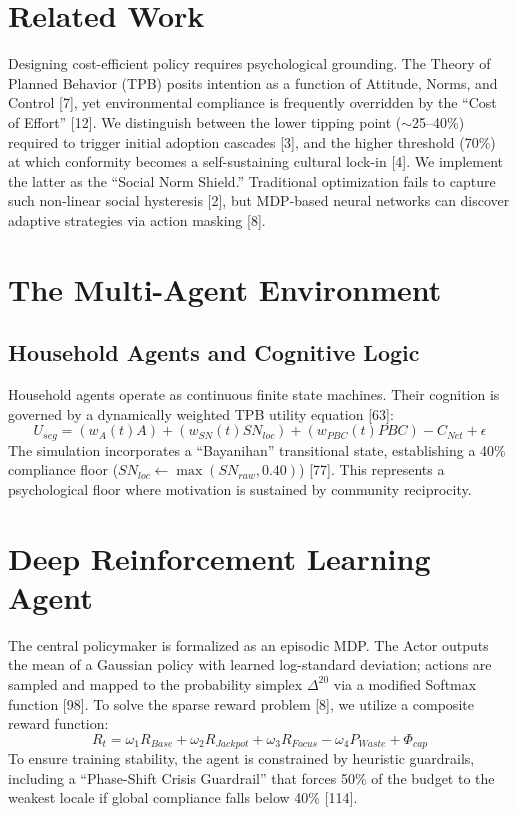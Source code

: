 \documentclass[runningheads]{llncs}
\begin{document}
\section{Related Work}
Designing cost-efficient policy requires psychological grounding. The Theory of Planned Behavior (TPB) posits intention as a function of Attitude, Norms, and Control [7], yet environmental compliance is frequently overridden by the ``Cost of Effort'' [12]. We distinguish between the lower tipping point ($\sim$25--40\%) required to trigger initial adoption cascades [3], and the higher threshold (70\%) at which conformity becomes a self-sustaining cultural lock-in [4]. We implement the latter as the ``Social Norm Shield.'' Traditional optimization fails to capture such non-linear social hysteresis [2], but MDP-based neural networks can discover adaptive strategies via action masking [8].

\section{The Multi-Agent Environment}
\subsection{Household Agents and Cognitive Logic}
Household agents operate as continuous finite state machines. Their cognition is governed by a dynamically weighted TPB utility equation [63]:
\begin{equation}
U_{seg} = (w_{A}(t)A) + (w_{SN}(t)SN_{loc}) + (w_{PBC}(t)PBC) - C_{Net} + \epsilon
\end{equation}
The simulation incorporates a ``Bayanihan'' transitional state, establishing a 40\% compliance floor ($SN_{loc} \leftarrow \max(SN_{raw}, 0.40)$) [77]. This represents a psychological floor where motivation is sustained by community reciprocity.

\section{Deep Reinforcement Learning Agent}
The central policymaker is formalized as an episodic MDP. The Actor outputs the mean of a Gaussian policy with learned log-standard deviation; actions are sampled and mapped to the probability simplex $\Delta^{20}$ via a modified Softmax function [98]. To solve the sparse reward problem [8], we utilize a composite reward function:
\begin{equation}
R_{t} = \omega_{1}R_{Base} + \omega_{2}R_{Jackpot} + \omega_{3}R_{Focus} - \omega_{4}P_{Waste} + \Phi_{cap}
\end{equation}
To ensure training stability, the agent is constrained by heuristic guardrails, including a ``Phase-Shift Crisis Guardrail'' that forces 50\% of the budget to the weakest locale if global compliance falls below 40\% [114].
\end{document}
